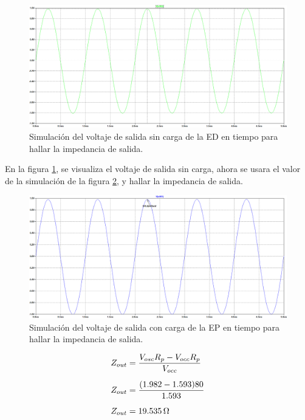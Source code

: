 \begin{enumerate}
        \begin{figure}[H]
          \centering
          \includegraphics[width=\textwidth]{Imagenes/vo_sc_ep.png}
          \caption{Simulación del voltaje de salida sin carga de la ED en tiempo para hallar la impedancia de salida.}
          \label{fig:vo_sc_ep}
        \end{figure}

        En la figura \ref{fig:vo_sc_ep}, se visualiza el voltaje de salida sin carga, ahora se usara el valor de la simulación de la figura \ref{fig:vo_cc_ep}, y hallar la impedancia de salida.

        \begin{figure}[H]
          \centering
          \includegraphics[width=\textwidth]{Imagenes/vo_cc_ep.png}
          \caption{Simulación del voltaje de salida con carga de la EP  en tiempo para hallar la impedancia de salida.}
          \label{fig:vo_cc_ep}
        \end{figure}

        \begin{align*}
          Z_{out} & = \dfrac{V_{osc}R_p - V_{occ}R_p}{V_{occ}} \\[0.2cm]
          Z_{out} & =\dfrac{(1.982-1.593)80}{1.593}            \\[0.2cm]
          Z_{out} & =19.535 \, \ohm                            \\[0.2cm]
        \end{align*}


\end{enumerate}
